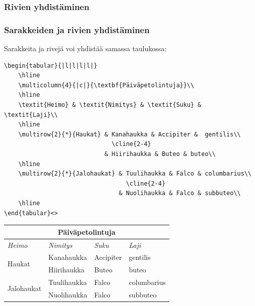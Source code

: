 \begin{frame}[fragile]
    \frametitle{Rivien yhdistäminen} 
    
\end{frame}

\begin{frame}[fragile]
    \frametitle{Sarakkeiden ja rivien yhdistäminen} 
    Sarakkeita ja rivejä voi yhdistää samassa taulukossa:
    \begin{lstlisting}[basicstyle=\ttfamily\scriptsize]
\begin{tabular}{|l|l|l|l|}
    \hline
    \multicolumn{4}{|c|}{\textbf{Päiväpetolintuja}}\\
    \hline
    \textit{Heimo} & \textit{Nimitys} & \textit{Suku} & \textit{Laji}\\
    \hline
    \multirow{2}{*}{Haukat} & Kanahaukka & Accipiter &  gentilis\\
                              \cline{2-4}
                            & Hiirihaukka & Buteo & buteo\\
    \hline
    \multirow{2}{*}{Jalohaukat} & Tuulihaukka & Falco & columbarius\\
                                  \cline{2-4}
                                & Nuolihaukka & Falco & subbuteo\\
    \hline
\end{tabular}<>
    \end{lstlisting}
    \begin{table}
        \begin{serif}
            \begin{scriptsize}
                \begin{tabular}{|l|l|l|l|}
                    \hline
                    \multicolumn{4}{|c|}{\textbf{Päiväpetolintuja}}\\
                    \hline
                    \textit{Heimo} & \textit{Nimitys} & \textit{Suku} & \textit{Laji}\\\hline
                    \multirow{2}{*}{Haukat} & Kanahaukka & Accipiter &  gentilis\\ \cline{2-4}
                                            & Hiirihaukka & Buteo & buteo\\ \hline
                    \multirow{2}{*}{Jalohaukat} & Tuulihaukka & Falco & columbarius\\ \cline{2-4}
                                                &Nuolihaukka & Falco & subbuteo\\ \hline
                \end{tabular}
            \end{scriptsize}
        \end{serif}
    \end{table}
\end{frame}

